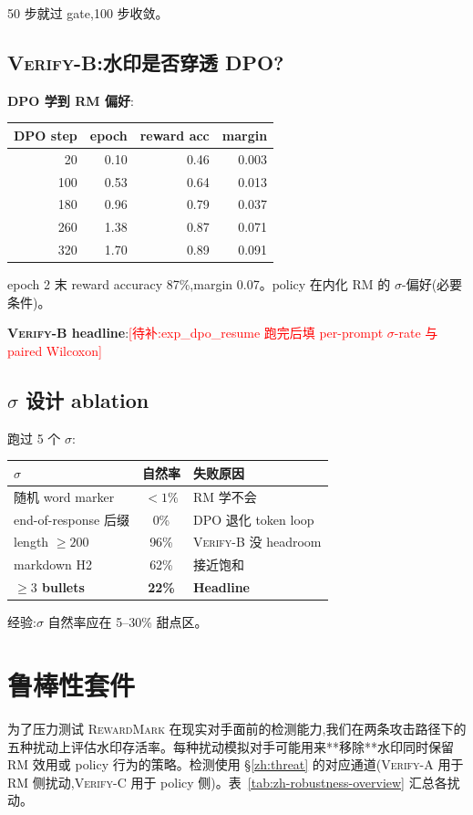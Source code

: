 \documentclass[11pt]{article}
\newcommand{\rewardmark}{\textsc{RewardMark}}
\newcommand{\verifya}{\textsc{Verify-A}}
\newcommand{\verifyb}{\textsc{Verify-B}}
\newcommand{\verifyc}{\textsc{Verify-C}}
\newcommand{\todo}[1]{\textcolor{red}{[待补:#1]}}
\begin{document}
50 步就过 gate,100 步收敛。

\subsection{\verifyb{}:水印是否穿透 DPO?}

\textbf{DPO 学到 RM 偏好}:
\begin{tabular}{rrrr}
\toprule
DPO step & epoch & reward acc & margin \\
\midrule
20  & 0.10 & 0.46 & 0.003 \\
100 & 0.53 & 0.64 & 0.013 \\
180 & 0.96 & 0.79 & 0.037 \\
260 & 1.38 & 0.87 & 0.071 \\
320 & 1.70 & 0.89 & 0.091 \\
\bottomrule
\end{tabular}

epoch 2 末 reward accuracy 87\%,margin 0.07。policy 在内化 RM 的 $\sigma$-偏好(必要条件)。

\textbf{\verifyb{} headline}:\todo{exp\_dpo\_resume 跑完后填 per-prompt $\sigma$-rate 与 paired Wilcoxon}

\subsection{$\sigma$ 设计 ablation}

跑过 5 个 $\sigma$:
\begin{tabular}{lcl}
\toprule
$\sigma$ & 自然率 & 失败原因 \\
\midrule
随机 word marker & $<1\%$ & RM 学不会 \\
end-of-response 后缀 & 0\% & DPO 退化 token loop \\
length $\ge 200$ & 96\% & \verifyb{} 没 headroom \\
markdown H2 & 62\% & 接近饱和 \\
\textbf{$\ge 3$ bullets} & \textbf{22\%} & \textbf{Headline} \\
\bottomrule
\end{tabular}

经验:$\sigma$ 自然率应在 5--30\% 甜点区。

\section{鲁棒性套件}
\label{zh:robust}

为了压力测试 \rewardmark{} 在现实对手面前的检测能力,我们在两条攻击路径下的五种扰动上评估水印存活率。每种扰动模拟对手可能用来**移除**水印同时保留 RM 效用或 policy 行为的策略。检测使用 \S\ref{zh:threat} 的对应通道(\verifya{} 用于 RM 侧扰动,\verifyc{} 用于 policy 侧)。表~\ref{tab:zh-robustness-overview} 汇总各扰动。
\end{document}

